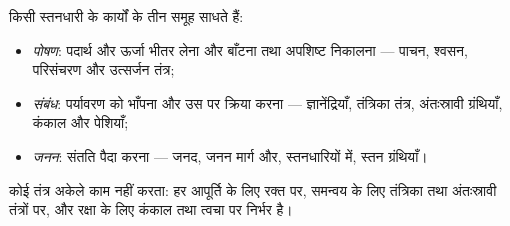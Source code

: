 \begin{proposition}[कार्यों के तीन समूह]\label{prop:b1:mammal-organization:functions}
किसी स्तनधारी के  कार्यों के तीन समूह साधते हैं:
\begin{itemize}
  \item \emph{पोषण}: पदार्थ और ऊर्जा भीतर लेना और
        बाँटना तथा अपशिष्ट निकालना --- पाचन, श्वसन, परिसंचरण और
        उत्सर्जन तंत्र;
  \item \emph{संबंध}: पर्यावरण को भाँपना और उस पर
        क्रिया करना --- ज्ञानेंद्रियाँ, तंत्रिका तंत्र, अंतःस्रावी
        ग्रंथियाँ, कंकाल और पेशियाँ;
  \item \emph{जनन}: संतति पैदा करना --- जनद, जनन मार्ग
        और, स्तनधारियों में, स्तन ग्रंथियाँ।
\end{itemize}
कोई तंत्र अकेले काम नहीं करता: हर  आपूर्ति के लिए रक्त पर, समन्वय के
लिए तंत्रिका तथा अंतःस्रावी तंत्रों पर, और रक्षा के लिए कंकाल तथा त्वचा
पर निर्भर है।
\end{proposition}


